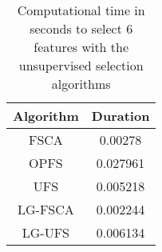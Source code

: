 \begin{table}
	\begin{center}
		\begin{tabular}{c c}
			Algorithm & Duration \\
			\hline
			FSCA & 0.00278 \\
			OPFS & 0.027961 \\
			UFS & 0.005218 \\
			LG-FSCA & 0.002244 \\
			LG-UFS & 0.006134 \\
		\end{tabular}
	\end{center}
	\caption{Computational time in seconds to select 6 features with the unsupervised selection algorithms}
\end{table}